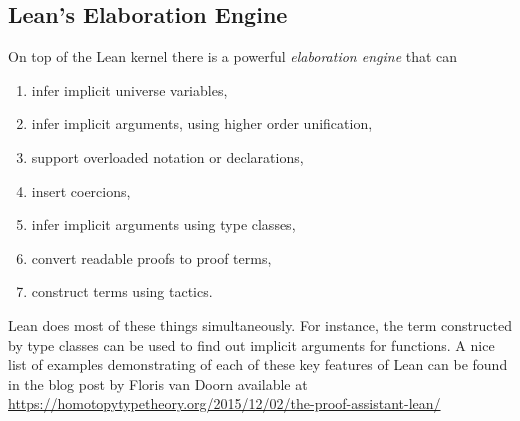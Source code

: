 \documentclass[11pt]{amsart}  %
\begin{document}








\subsection{Lean's Elaboration Engine}

On top of the Lean kernel there is a powerful \emph{elaboration engine} that can
\begin{enumerate}
\item infer implicit universe variables,
\item infer implicit arguments, using higher order unification,
\item support overloaded notation or declarations,
\item insert coercions,
\item infer implicit arguments using type classes,
\item convert readable proofs to proof terms,
\item construct terms using tactics.
\end{enumerate}
Lean does most of these things simultaneously. For instance, the term constructed by
type classes can be used to find out implicit arguments for functions.
A nice list of examples demonstrating of each of these key features of Lean can be found in the blog post by Floris van Doorn available at
\url{https://homotopytypetheory.org/2015/12/02/the-proof-assistant-lean/}
\end{document}
